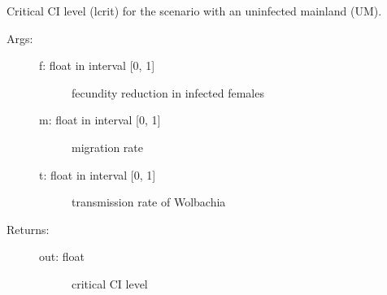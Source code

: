 \documentclass[letterpaper,10pt,english]{sphinxmanual}
\begin{document}

\begin{fulllineitems}
\label{index:wspec.analytical.lcrit_UM}
Critical CI level (lcrit) for the scenario with an uninfected 
mainland (UM).
\begin{description}
\item[{Args:}] \leavevmode\begin{description}
\item[{f: float in interval {[}0, 1{]}}] \leavevmode
fecundity reduction in infected females

\item[{m: float in interval {[}0, 1{]}}] \leavevmode
migration rate

\item[{t: float in interval {[}0, 1{]}}] \leavevmode
transmission rate of Wolbachia

\end{description}

\item[{Returns:}] \leavevmode\begin{description}
\item[{out: float}] \leavevmode
critical CI level

\end{description}

\end{description}

\end{fulllineitems}

\end{document}
